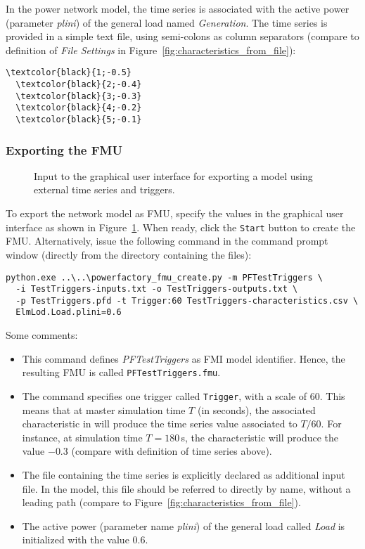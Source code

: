 In the power network model, the time series is associated with the active power (parameter \emph{plini}) of the general load named \emph{Generation}. The time series is provided in a simple text file, using semi-colons as column separators (compare to definition of \emph{File Settings} in Figure~\ref{fig:characteristics_from_file}):
\begin{Verbatim}[frame=single,commandchars=\\\{\}]
  \textcolor{black}{1;-0.5}
  \textcolor{black}{2;-0.4}
  \textcolor{black}{3;-0.3}
  \textcolor{black}{4;-0.2}
  \textcolor{black}{5;-0.1}
\end{Verbatim}

\subsubsection*{Exporting the FMU}

\begin{figure}[h!]
\vspace*{1em}
\caption{Input to the graphical user interface for exporting a model using external time series and triggers.}
\label{fig:gui_create_trigger}
\end{figure}

To export the network model as FMU, specify the values in the graphical user interface as shown in Figure~\ref{fig:gui_create_trigger}.
When ready, click the \texttt{Start} button to create the FMU.
Alternatively, issue the following command in the command prompt window (directly from the directory containing the files):
\begin{verbatim}
python.exe ..\..\powerfactory_fmu_create.py -m PFTestTriggers \
  -i TestTriggers-inputs.txt -o TestTriggers-outputs.txt \
  -p TestTriggers.pfd -t Trigger:60 TestTriggers-characteristics.csv \
  ElmLod.Load.plini=0.6
\end{verbatim}
Some comments:
\begin{itemize}
  \item This command defines \emph{PFTestTriggers} as FMI model identifier.
  Hence, the resulting FMU is called \texttt{PFTestTriggers.fmu}.
  \item The command specifies one trigger called \texttt{Trigger}, with a scale of 60.
  This means that at master simulation time $T$ (in seconds), the associated characteristic in \pf will produce the time series value associated to $T/60$.
  For instance, at simulation time $T=180\,$s, the characteristic will produce the value $-0.3$ (compare with definition of time series above).
  \item The file containing the time series is explicitly declared as additional input file.
  In the \pf model, this file should be referred to directly by name, without a leading path (compare to Figure~\ref{fig:characteristics_from_file}).
  \item The active power (parameter name \emph{plini}) of the general load called \emph{Load} is initialized with the value $0.6$.
\end{itemize}

